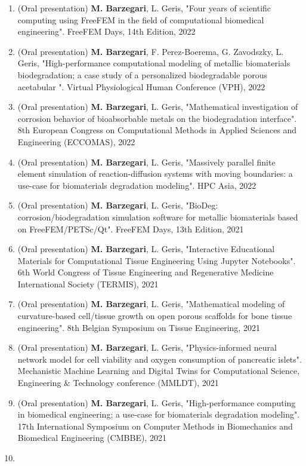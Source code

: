 \documentclass{cv}
\begin{document}
\begin{enumerate}[itemsep=-0.2ex]
\item
(Oral presentation) 
\textbf{M. Barzegari}, L. Geris, "Four years of scientific computing using FreeFEM in the field of computational biomedical engineering". FreeFEM Days, 14th Edition, 2022
\item
(Oral presentation) 
\textbf{M. Barzegari}, F. Perez-Boerema, G. Zavodszky, L. Geris, "High-performance computational modeling of metallic biomaterials biodegradation; a case study of a personalized biodegradable porous acetabular ". Virtual Physiological Human Conference (VPH), 2022
\item
(Oral presentation) 
\textbf{M. Barzegari}, L. Geris, "Mathematical investigation of corrosion behavior of bioabsorbable metals on the biodegradation interface". 8th European Congress on Computational Methods in Applied Sciences and Engineering (ECCOMAS), 2022
\item
(Oral presentation) 
\textbf{M. Barzegari}, L. Geris, "Massively parallel finite element simulation of reaction-diffusion systems with moving boundaries: a use-case for biomaterials degradation modeling". HPC Asia, 2022
\item
(Oral presentation) 
\textbf{M. Barzegari}, L. Geris, "BioDeg: corrosion/biodegradation simulation software for metallic biomaterials based on FreeFEM/PETSc/Qt". FreeFEM Days, 13th Edition, 2021
\item
(Oral presentation) 
\textbf{M. Barzegari}, L. Geris, "Interactive Educational Materials for Computational Tissue Engineering Using Jupyter Notebooks". 6th World Congress of Tissue Engineering and Regenerative Medicine International Society (TERMIS), 2021
\item
(Oral presentation) 
\textbf{M. Barzegari}, L. Geris, "Mathematical modeling of curvature-based cell/tissue growth on open porous scaffolds for bone tissue engineering". 8th Belgian Symposium on Tissue Engineering, 2021
\item
(Oral presentation)
\textbf{M. Barzegari}, L. Geris, "Physics-informed neural network model for cell viability and oxygen consumption of pancreatic islets". Mechanistic Machine Learning and Digital Twins for Computational Science, Engineering \& Technology conference (MMLDT), 2021
\item
(Oral presentation)
\textbf{M. Barzegari}, L. Geris, "High-performance computing in biomedical engineering; a use-case for biomaterials degradation modeling". 17th International Symposium on Computer Methods in Biomechanics and Biomedical Engineering (CMBBE), 2021
\item

\end{enumerate}
\end{document}
